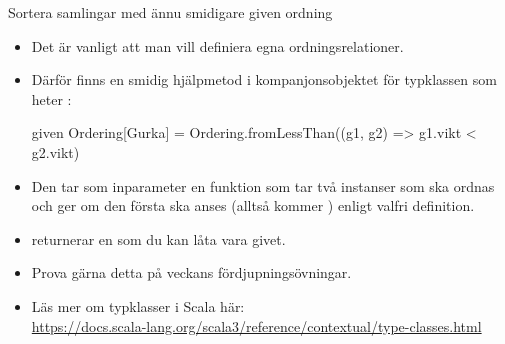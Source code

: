 \begin{Slide}{Sortera samlingar med ännu smidigare given ordning}\SlideFontSmall

\begin{itemize}
  \item Det är vanligt att man vill definiera egna ordningsrelationer.
  \item Därför finns en smidig hjälpmetod i kompanjonsobjektet för typklassen  som heter :
\begin{Code}
given Ordering[Gurka] = 
  Ordering.fromLessThan((g1, g2) => g1.vikt < g2.vikt)
\end{Code}
 
  \item Den tar som inparameter en funktion som tar två instanser som ska ordnas och ger  om den första ska anses  (alltså kommer ) enligt valfri definition. 
  \item {} returnerar en  som du kan låta vara givet.
  \item Prova gärna detta på veckans fördjupningsövningar.
  \item Läs mer om typklasser i Scala här: \\ \url{https://docs.scala-lang.org/scala3/reference/contextual/type-classes.html}
\end{itemize}

\end{Slide}

